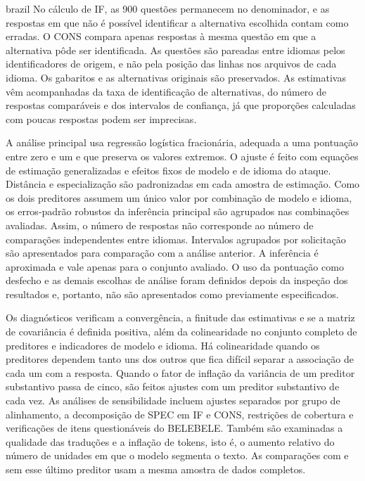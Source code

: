 \begin{otherlanguage*}{brazil}
No cálculo de IF, as 900 questões permanecem no denominador, e as respostas em que não é possível identificar a alternativa escolhida contam como erradas. O CONS compara apenas respostas à mesma questão em que a alternativa pôde ser identificada. As questões são pareadas entre idiomas pelos identificadores de origem, e não pela posição das linhas nos arquivos de cada idioma. Os gabaritos e as alternativas originais são preservados. As estimativas vêm acompanhadas da taxa de identificação de alternativas, do número de respostas comparáveis e dos intervalos de confiança, já que proporções calculadas com poucas respostas podem ser imprecisas.

A análise principal usa regressão logística fracionária, adequada a uma pontuação entre zero e um e que preserva os valores extremos. O ajuste é feito com equações de estimação generalizadas e efeitos fixos de modelo e de idioma do ataque. Distância e especialização são padronizadas em cada amostra de estimação. Como os dois preditores assumem um único valor por combinação de modelo e idioma, os erros-padrão robustos da inferência principal são agrupados nas \RNumCells{} combinações avaliadas. Assim, o número de respostas não corresponde ao número de comparações independentes entre idiomas. Intervalos agrupados por solicitação são apresentados para comparação com a análise anterior. A inferência é aproximada e vale apenas para o conjunto avaliado. O uso da pontuação como desfecho e as demais escolhas de análise foram definidos depois da inspeção dos resultados e, portanto, não são apresentados como previamente especificados.

Os diagnósticos verificam a convergência, a finitude das estimativas e se a matriz de covariância é definida positiva, além da colinearidade no conjunto completo de preditores e indicadores de modelo e idioma. Há colinearidade quando os preditores dependem tanto uns dos outros que fica difícil separar a associação de cada um com a resposta. Quando o fator de inflação da variância de um preditor substantivo passa de cinco, são feitos ajustes com um preditor substantivo de cada vez. As análises de sensibilidade incluem ajustes separados por grupo de alinhamento, a decomposição de SPEC em IF e CONS, restrições de cobertura e verificações de itens questionáveis do BELEBELE. Também são examinadas a qualidade das traduções e a inflação de tokens, isto é, o aumento relativo do número de unidades em que o modelo segmenta o texto. As comparações com e sem esse último preditor usam a mesma amostra de dados completos.


\end{otherlanguage*}
